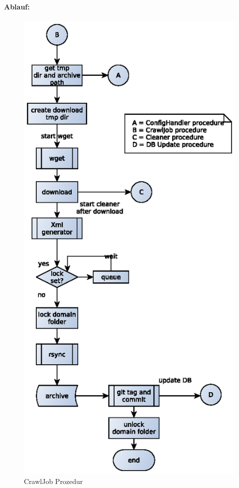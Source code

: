 \paragraph{Ablauf:}
\label{par:ablauf_}
\begin{figure}[h]
	\centering
	\label{dia:design:backend:overview}
	\includegraphics[width=\textwidth]{design/data/crawljob.eps}
	\caption{CrawlJob Prozedur}
\end{figure}



